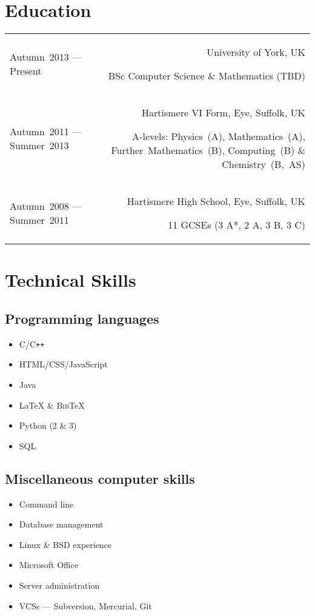 \documentclass[11pt,a4paper]{article}
\newcommand{\cpp}{C{}\texttt{++}}
\begin{document}
\section*{Education}
\begin{tabularx}{\textwidth}{@{}L R@{}}
  Autumn~2013 --- Present &
  University of York, UK \par
  BSc Computer Science \& Mathematics (TBD)

  \tabularnewline%

  Autumn~2011 --- Summer~2013 &
	Hartismere VI Form, Eye, Suffolk, UK \par
  A-levels: Physics~(A), Mathematics~(A), Further~Mathematics~(B), Computing~(B) \& Chemistry~(B,~AS)

  \tabularnewline%

  Autumn~2008 --- Summer~2011 &
  Hartismere High School, Eye, Suffolk, UK \par
  11 GCSEs (3 A*, 2 A, 3 B, 3 C)
\end{tabularx}

\section*{Technical Skills}
\begin{minipage}[t]{.45\textwidth}
\subsection*{Programming languages}
\begin{itemize}
  \item C/\cpp%
  \item HTML/CSS/JavaScript
  \item Java
  \item \LaTeX{} \& \textsc{Bib}\TeX%
  \item Python (2 \& 3)
  \item SQL
\end{itemize}
\end{minipage}
\hspace{0.5cm}
\begin{minipage}[t]{.45\textwidth}
\subsection*{Miscellaneous computer skills}
\begin{itemize}
  \item Command line
  \item Database management
  \item Linux \& BSD experience
  \item Microsoft Office
  \item Server administration
  \item VCSs --- Subversion, Mercurial, Git
\end{itemize}
\end{minipage}
\end{document}
